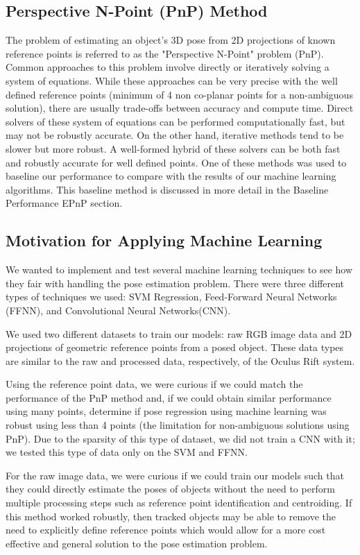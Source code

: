 \documentclass[journal]{IEEEtran}
\begin{document}
\subsection{Perspective N-Point (PnP) Method}
The problem of estimating an object's 3D pose from 2D projections of known reference points is referred to as the "Perspective N-Point" problem (PnP). 
Common approaches to this problem involve directly or iteratively solving a system of equations\cite{EPnP}. While these approaches can be very precise with the well defined reference points (minimum of 4 non co-planar points for a non-ambiguous solution), there are usually trade-offs between accuracy and compute time. Direct solvers of these system of equations can be performed computationally fast, but may not be robustly accurate. On the other hand, iterative methods tend to be slower but more robust. A well-formed hybrid of these solvers can be both fast and robustly accurate for well defined points. One of these methods was used to baseline our performance to compare with the results of our machine learning algorithms. This baseline method is discussed in more detail in the Baseline Performance EPnP section.



\subsection{Motivation for Applying Machine Learning}
We wanted to implement and test several machine learning techniques to see how they fair with handling the pose estimation problem. There were three different types of techniques we used: SVM Regression, Feed-Forward Neural Networks (FFNN), and Convolutional Neural Networks(CNN). 

We used two different datasets to train our models: raw RGB image data and 2D projections of geometric reference points from a posed object.
These data types are similar to the raw and processed data, respectively, of the Oculus Rift system. 

Using the reference point data, we were curious if we could match the performance of the PnP method and, if we could obtain similar performance using many points, determine if pose regression using machine learning was robust using less than 4 points (the limitation for non-ambiguous solutions using PnP). Due to the sparsity of this type of dataset, we did not train a CNN with it; we tested this type of data only on the SVM and FFNN. 

For the raw image data, we were curious if we could train our models such that they could directly estimate the poses of objects without the need to perform multiple processing steps such as reference point identification and centroiding. If this method worked robustly, then tracked objects may be able to remove the need to explicitly define reference points which would allow for a more cost effective and general solution to the pose estimation problem. 
 
\end{document}
